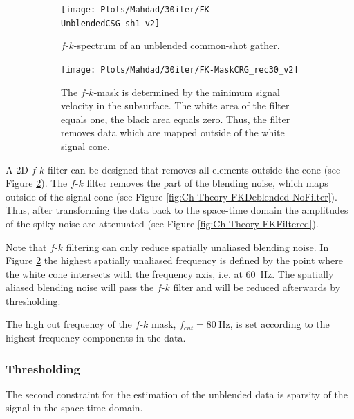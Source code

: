 \begin{figure}
	\centering
	\begin{subfigure}[t]{0.45\textwidth}
		\centering
		\texttt{[image: Plots/Mahdad/30iter/FK-UnblendedCSG\_sh1\_v2]}
		\caption{$f$-$k$-spectrum of an unblended common-shot gather.}
		\label{fig:Ch-Theory-fk-Unblended-data}
	\end{subfigure}
	\centering
	\begin{subfigure}[t]{0.45\textwidth}
		\centering
		\texttt{[image: Plots/Mahdad/30iter/FK-MaskCRG\_rec30\_v2]}
		\caption{The $f$-$k$-mask is determined by the minimum signal velocity in the subsurface. The white area of the filter equals one, the black area equals zero. Thus, the filter removes data which are mapped outside of the white signal cone.}
		\label{fig:Ch-Theory-FK-Mask}
	\end{subfigure}
	
	\caption{}
	\label{fig:Ch-Theory-fk-unblended-data-mask}
\end{figure}

A 2D $f$-$k$ filter can be designed that removes all elements outside the cone (see Figure \ref{fig:Ch-Theory-FK-Mask}). The $f$-$k$ filter removes the part of the blending noise, which maps outside of the signal cone (see Figure \ref{fig:Ch-Theory-FKDeblended-NoFilter}). Thus, after transforming the data back to the space-time domain the amplitudes of the spiky noise are attenuated (see Figure \ref{fig:Ch-Theory-FKFiltered}). 

Note that $f$-$k$ filtering can only reduce spatially unaliased blending noise. In Figure \ref{fig:Ch-Theory-FK-Mask} the highest spatially unaliased frequency is defined by the point where the white cone intersects with the frequency axis, i.e. at \SI{60}{\hertz}. The spatially aliased blending noise will pass the $f$-$k$ filter and will be reduced afterwards by thresholding. 

The high cut frequency of the $f$-$k$ mask, $f_{cut} = \SI{80}{\hertz}$, is set according to the highest frequency components in the data. 

\subsubsection*{Thresholding}

The second constraint for the estimation of the unblended data is sparsity of the signal in the space-time domain.

